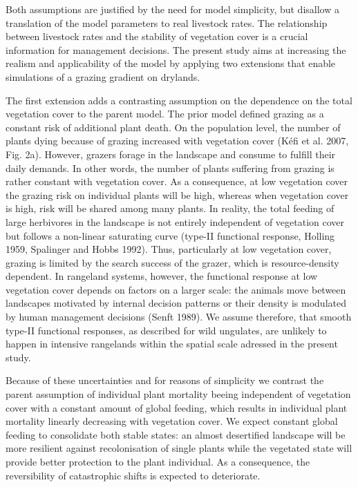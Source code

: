 Both assumptions are justified by the need for model simplicity, but disallow a translation of the model parameters to real livestock rates. The relationship between livestock rates and the stability of vegetation cover is a crucial information for management decisions. The present study aims at increasing the realism and applicability of the model by applying two extensions that enable simulations of a grazing gradient on drylands.

The first extension adds a contrasting assumption on the dependence on the total vegetation cover to the parent model. The prior model defined grazing as a constant risk of additional plant death. On the population level, the number of plants dying because of grazing increased with vegetation cover (K\'efi et al. 2007, Fig. 2a). However, grazers forage in the landscape and consume to fulfill their daily demands. In other words, the number of plants suffering from grazing is rather constant with vegetation cover. As a consequence, at low vegetation cover the grazing risk on individual plants will be high, whereas when vegetation cover is high, risk will be shared among many plants.
In reality, the total feeding of large herbivores in the landscape is not entirely independent of vegetation cover but follows a non-linear saturating curve (type-II functional response, Holling 1959, Spalinger and Hobbs 1992). Thus, particularly at low vegetation cover, grazing is limited by the search success of the grazer, which is resource-density dependent. In rangeland systems, however, the functional response at low vegetation cover depends on factors on a larger scale: the animals move between landscapes motivated by internal decision patterns or their density is modulated by human management decisions (Senft 1989). We assume therefore, that smooth type-II functional responses, as described for wild ungulates, are unlikely to happen in intensive rangelands within the spatial scale adressed in the present study.

Because of these uncertainties and for reasons of simplicity we contrast the parent assumption of individual plant mortality beeing independent of vegetation cover with a constant amount of global feeding, which results in individual plant mortality linearly decreasing with vegetation cover. We expect constant global feeding to consolidate both stable states: an almost desertified landscape will be more resilient against recolonisation of single plants while the vegetated state will provide better protection to the plant individual. As a consequence, the reversibility of catastrophic shifts is expected to deteriorate. 

